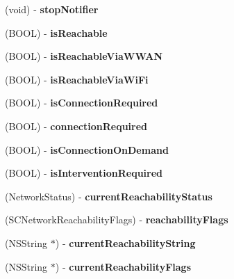 \begin{DoxyCompactItemize}
(void) -\/ {\bfseries stop\+Notifier}
\item 
\mbox{\label{interface_reachability_ae0b18fcacc97f538502cf671aa583dbd}} 
(B\+O\+OL) -\/ {\bfseries is\+Reachable}
\item 
\mbox{\label{interface_reachability_a20011128b407d36659bc78a64cd583f5}} 
(B\+O\+OL) -\/ {\bfseries is\+Reachable\+Via\+W\+W\+AN}
\item 
\mbox{\label{interface_reachability_a994f39db8e47480480ffd7ee81159ecb}} 
(B\+O\+OL) -\/ {\bfseries is\+Reachable\+Via\+Wi\+Fi}
\item 
\mbox{\label{interface_reachability_a294f9407cd32a05f26a480871df70901}} 
(B\+O\+OL) -\/ {\bfseries is\+Connection\+Required}
\item 
\mbox{\label{interface_reachability_a731496d70dd8bfbd1b364df13cac2b4c}} 
(B\+O\+OL) -\/ {\bfseries connection\+Required}
\item 
\mbox{\label{interface_reachability_af5bea7c2cfd6439a4ff5f0ab0b92e37b}} 
(B\+O\+OL) -\/ {\bfseries is\+Connection\+On\+Demand}
\item 
\mbox{\label{interface_reachability_ad44af2ebf5ffd986dacad06e63362550}} 
(B\+O\+OL) -\/ {\bfseries is\+Intervention\+Required}
\item 
\mbox{\label{interface_reachability_a8396438436e7ff3770039fb527cd1d34}} 
(Network\+Status) -\/ {\bfseries current\+Reachability\+Status}
\item 
\mbox{\label{interface_reachability_ac9080e40006cd8c82431a668ec8bfe18}} 
(S\+C\+Network\+Reachability\+Flags) -\/ {\bfseries reachability\+Flags}
\item 
\mbox{\label{interface_reachability_a330168ffeabffcaef7a48f3fa6246ad9}} 
(N\+S\+String $\ast$) -\/ {\bfseries current\+Reachability\+String}
\item 
\mbox{\label{interface_reachability_adb7b67aebd5158a84006db23e0f0f950}} 
(N\+S\+String $\ast$) -\/ {\bfseries current\+Reachability\+Flags}
\end{DoxyCompactItemize}
